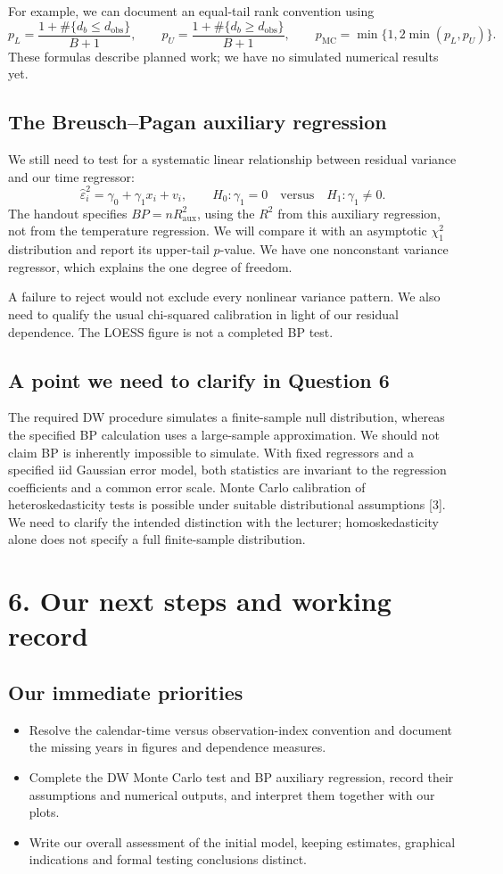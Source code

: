 \documentclass[11pt,a4paper]{article}
\newcommand{\heading}[1]{\section*{\sffamily\color{navy}#1}}
\newcommand{\subheading}[1]{\subsection*{\sffamily\color{navy}#1}}
\newcommand{\pending}{\ensuremath{\square}}
\begin{document}
For example, we can document an equal-tail rank convention using
\[
p_L=\frac{1+\#\{d_b\leq d_{\mathrm{obs}}\}}{B+1},\qquad
p_U=\frac{1+\#\{d_b\geq d_{\mathrm{obs}}\}}{B+1},\qquad
p_{\mathrm{MC}}=\min\{1,2\min(p_L,p_U)\}.
\]
These formulas describe planned work; we have no simulated numerical results yet.

\subheading{The Breusch--Pagan auxiliary regression}
We still need to test for a systematic linear relationship between residual variance and our time regressor:
\[
\widehat\varepsilon_i^2=\gamma_0+\gamma_1x_i+v_i,
\qquad H_0:\gamma_1=0\quad\text{versus}\quad H_1:\gamma_1\ne0.
\]
The handout specifies $BP=nR^2_{\mathrm{aux}}$, using the $R^2$ from this auxiliary regression, not from the temperature regression. We will compare it with an asymptotic $\chi^2_1$ distribution and report its upper-tail $p$-value. We have one nonconstant variance regressor, which explains the one degree of freedom.

A failure to reject would not exclude every nonlinear variance pattern. We also need to qualify the usual chi-squared calibration in light of our residual dependence. The LOESS figure is not a completed BP test.

\subheading{A point we need to clarify in Question 6}
The required DW procedure simulates a finite-sample null distribution, whereas the specified BP calculation uses a large-sample approximation. We should not claim BP is inherently impossible to simulate. With fixed regressors and a specified iid Gaussian error model, both statistics are invariant to the regression coefficients and a common error scale. Monte Carlo calibration of heteroskedasticity tests is possible under suitable distributional assumptions [3]. We need to clarify the intended distinction with the lecturer; homoskedasticity alone does not specify a full finite-sample distribution.

\newpage
\heading{6. Our next steps and working record}
\subheading{Our immediate priorities}
\begin{itemize}[label=\pending]
\item Resolve the calendar-time versus observation-index convention and document the missing years in figures and dependence measures.
\item Complete the DW Monte Carlo test and BP auxiliary regression, record their assumptions and numerical outputs, and interpret them together with our plots.
\item Write our overall assessment of the initial model, keeping estimates, graphical indications and formal testing conclusions distinct.
\end{itemize}
\end{document}

